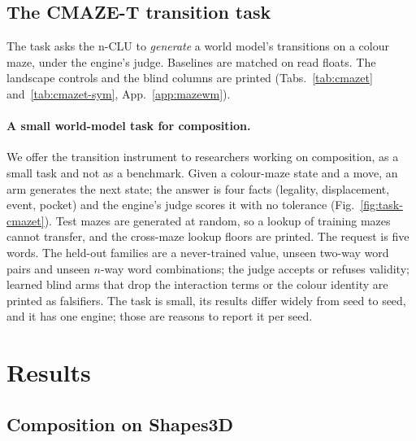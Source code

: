 \documentclass{article} %
\begin{document}
\subsection{The CMAZE-T transition task}
\label{sec:maze}

The task asks the n-CLU to \emph{generate} a world model's transitions on a colour maze, under
the engine's judge. Baselines are matched on read floats. The landscape controls and the blind columns
are printed (Tabs.~\ref{tab:cmazet} and~\ref{tab:cmazet-sym},
App.~\ref{app:mazewm}).

\paragraph{A small world-model task for composition.} We offer the
transition instrument to researchers working on composition, as a small task and not as a benchmark.
Given a colour-maze state and a move, an arm generates the next state; the answer is four facts
(legality, displacement, event, pocket) and the engine's judge scores it with no tolerance
(Fig.~\ref{fig:task-cmazet}). Test mazes are generated at random, so a lookup of training mazes
cannot transfer, and the cross-maze lookup floors are printed. The request is five words. The
held-out families are a never-trained value, unseen two-way word pairs and unseen $n$-way word
combinations; the judge accepts or refuses validity; learned blind arms that drop the interaction
terms or the colour identity are printed as falsifiers. The task is small, its results differ widely from seed to seed, and it has one engine; those are
reasons to report it per seed.

\section{Results}
\label{sec:results}

\subsection{Composition on Shapes3D}
\label{sec:shapes-t7}
\end{document}
